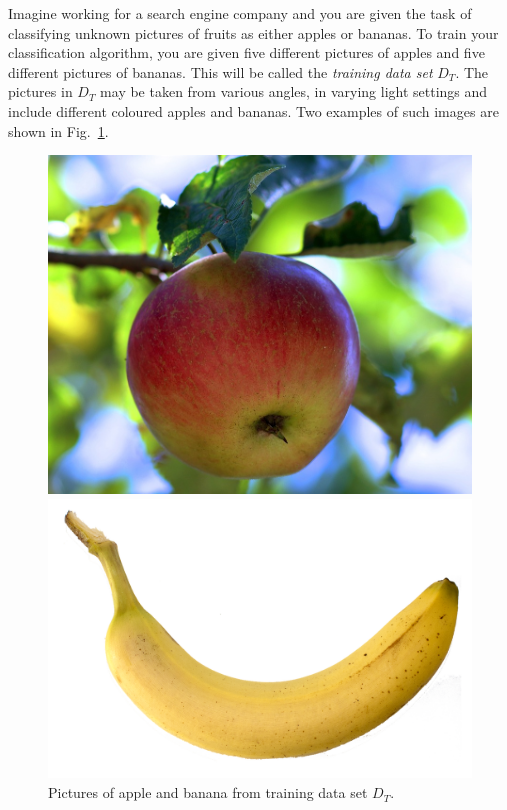 Imagine working for a search engine company and you are given the task of classifying unknown pictures of fruits as either apples or bananas. To train your classification algorithm, you are given five different pictures of apples and five different pictures of bananas. This will be called the \emph{training data set} ${D}_{T}$. The pictures in ${D}_{T}$ may be taken from various angles, in varying light settings and include different coloured apples and bananas. Two examples of such images are shown in Fig.~\ref{img:appleandbanana}. 

\begin{figure}[H]
  \begin{minipage}[t]{0.48\textwidth}
    \includegraphics[width = \textwidth]{img/apple.jpg}
  \end{minipage}
  \hfill
  \begin{minipage}[t]{0.48\textwidth}
    \includegraphics[width = \textwidth]{img/banana.png}
  \end{minipage}
  \caption[]{Pictures of apple and banana from training data set ${D}_{T}$.\footnotemark[3]}
  \label{img:appleandbanana}
\end{figure}


